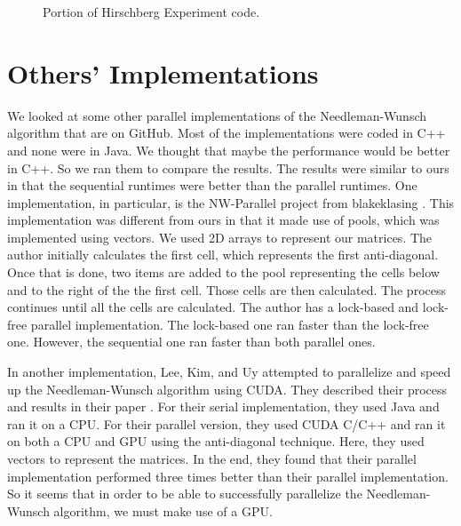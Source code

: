 \documentclass[conference]{IEEEtran}
\begin{document}
\begin{figure}[htbp]
\centerline{}
\caption{Portion of Hirschberg Experiment code.}
\label{16}
\end{figure}

\section{Others' Implementations}
We looked at some other parallel implementations of the Needleman-Wunsch algorithm that are on GitHub. Most of the implementations were coded in C++ and none were in Java. We thought that maybe the performance would be better in C++. So we ran them to compare the results. The results were similar to ours in that the sequential runtimes were better than the parallel runtimes. One implementation, in particular, is the NW-Parallel project from blakeklasing \cite{blakeklasing}. This implementation was different from ours in that it made use of pools, which was implemented using vectors. We used 2D arrays to represent our matrices. The author initially calculates the first cell, which represents the first anti-diagonal. Once that is done, two items are added to the pool representing the cells below and to the right of the the first cell. Those cells are then calculated. The process continues until all the cells are calculated. The author has a lock-based and lock-free parallel implementation. The lock-based one ran faster than the lock-free one. However, the sequential one ran faster than both parallel ones.

In another implementation, Lee, Kim, and Uy attempted to parallelize and speed up the Needleman-Wunsch algorithm using CUDA. They described their process and results in their paper \cite{lee_kim_uy_2020}. For their serial implementation, they used Java and ran it on a CPU. For their parallel version, they used CUDA C/C++ and ran it on both a CPU and GPU using the anti-diagonal technique. Here, they used vectors to represent the matrices. In the end, they found that their parallel implementation performed three times better than their parallel implementation. So it seems that in order to be able to successfully parallelize the Needleman-Wunsch algorithm, we must make use of a GPU.
\end{document}
